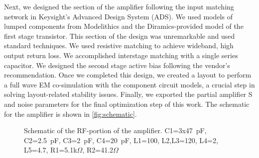 Next, we designed the section of the amplifier following the input matching network in Keysight's Advanced Design System (ADS).
We used models of lumped components from Modelithics and the Diramics-provided model of the first stage transistor.
This section of the design was unremarkable and used standard techniques.
We used resistive matching to achieve wideband, high output return loss.
We accomplished interstage matching with a single series capacitor.
We designed the second stage active bias following the vendor's recommendation.
Once we completed this design, we created a layout to perform a full wave EM co-simulation with the component circuit models, a crucial step in solving layout-related stability issues.
Finally, we exported the partial amplifier S and noise parameters for the final optimization step of this work.
The schematic for the amplifier is shown in \autoref{fig:schematic}.

\begin{figure}[t]
	\centering
	\caption[Schematic of the RF-portion of the LNA]{Schematic of the RF-portion of the amplifier. C1=3x\qty{47}{\pF}, C2=\qty{2.5}{\pF}, C3=\qty{2}{\pF}, C4=\qty{20}{\pF}, L1=\qty{100}{\nH}, L2,L3=\qty{120}{\nH}, L4=\qty{2}{\nH}, L5=\qty{4.7}{\nH}, R1=5.1k$\Omega$, R2=41.2$\Omega$} %
	\label{fig:schematic}
\end{figure}

